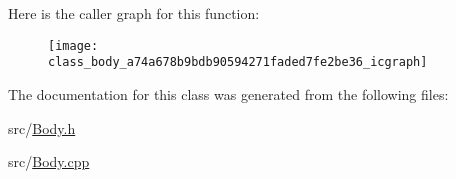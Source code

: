 Here is the caller graph for this function\+:
\nopagebreak
\begin{figure}[H]
\begin{center}
\leavevmode
\texttt{[image: class\_body\_a74a678b9bdb90594271faded7fe2be36\_icgraph]}
\end{center}
\end{figure}




The documentation for this class was generated from the following files\+:\begin{DoxyCompactItemize}
\item 
src/\hyperlink{_body_8h}{Body.\+h}\item 
src/\hyperlink{_body_8cpp}{Body.\+cpp}\end{DoxyCompactItemize}
